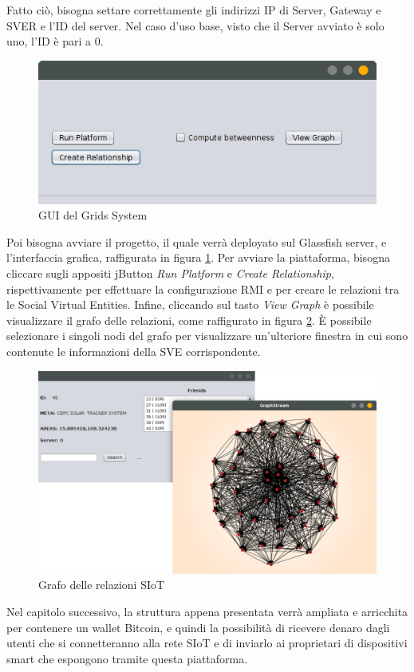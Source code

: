 Fatto ciò, bisogna settare correttamente gli indirizzi IP di Server, Gateway e SVER e l'ID del server. Nel caso d'uso base, visto che il Server avviato è solo uno, l'ID è pari a 0. 

\begin{figure}[h!t]
\centerline{\includegraphics[scale=2.5]{img/gui1}}
\caption{GUI del Grids System}
\label{f:grids:gui1}
\end{figure}

Poi bisogna avviare il progetto, il quale verrà deployato sul Glassfish server, e l'interfaccia grafica, raffigurata in figura \ref{f:grids:gui1}.
Per avviare la piattaforma, bisogna cliccare sugli appositi jButton \textit{Run Platform} e \textit{Create Relationship}, rispettivamente per effettuare la configurazione RMI e per creare le relazioni tra le Social Virtual Entities. Infine, cliccando sul tasto \textit{View Graph} è possibile visualizzare il grafo delle relazioni, come raffigurato in figura \ref{f:grids:gui2}. È possibile selezionare i singoli nodi del grafo per visualizzare un'ulteriore finestra in cui sono contenute le informazioni della SVE corrispondente.

\begin{figure}[h!t]
\centerline{\includegraphics[width=\textwidth]{img/gui2}}
\caption{Grafo delle relazioni SIoT}
\label{f:grids:gui2}
\end{figure}

Nel capitolo successivo, la struttura appena presentata verrà ampliata e arricchita per contenere un wallet Bitcoin, e quindi la possibilità di ricevere denaro dagli utenti che si connetteranno alla rete SIoT e di inviarlo ai proprietari di dispositivi smart che espongono tramite questa piattaforma.